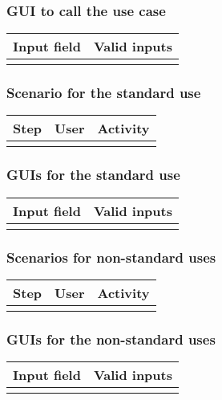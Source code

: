 \documentclass[12pt]{article}
\theoremstyle{definition}
\begin{document}
\subsubsection{GUI to call the use case}

\begin{tabular}{|l|l|}
\hline
Input field & Valid inputs \\ \hline
 &  \\ \hline
\end{tabular}

\subsubsection{Scenario for the standard use}

\begin{tabular}{|l|l|l|}
\hline
Step & User & Activity \\ \hline
 & & \\ \hline
\end{tabular}

\subsubsection{GUIs for the standard use}
\begin{tabular}{|l|l|}
\hline
Input field & Valid inputs \\ \hline
 &  \\ \hline
\end{tabular}
\subsubsection{Scenarios for non-standard uses}

\begin{tabular}{|l|l|l|}
\hline
Step & User & Activity \\ \hline
 & & \\ \hline
\end{tabular}

\subsubsection{GUIs for the non-standard uses}

\begin{tabular}{|l|l|}
\hline
Input field & Valid inputs \\ \hline
 &  \\ \hline
\end{tabular}
\end{document}
